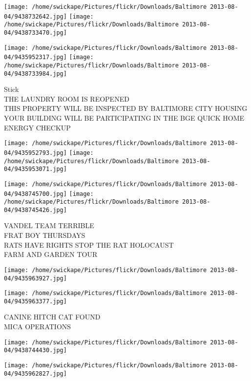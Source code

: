 \documentclass[10pt,letterpaper]{article}
\begin{document}
\texttt{[image: /home/swickape/Pictures/flickr/Downloads/Baltimore 2013-08-04/9438732642.jpg]}
\texttt{[image: /home/swickape/Pictures/flickr/Downloads/Baltimore 2013-08-04/9438733470.jpg]}

\texttt{[image: /home/swickape/Pictures/flickr/Downloads/Baltimore 2013-08-04/9435952317.jpg]}
\texttt{[image: /home/swickape/Pictures/flickr/Downloads/Baltimore 2013-08-04/9438733984.jpg]}

Stick\\
THE LAUNDRY ROOM IS REOPENED\\
THIS PROPERTY WILL BE INSPECTED BY BALTIMORE CITY HOUSING\\
YOUR BUILDING WILL BE PARTICIPATING IN THE BGE QUICK HOME ENERGY CHECKUP\\
\pagebreak

\texttt{[image: /home/swickape/Pictures/flickr/Downloads/Baltimore 2013-08-04/9435952793.jpg]}
\texttt{[image: /home/swickape/Pictures/flickr/Downloads/Baltimore 2013-08-04/9435953071.jpg]}

\texttt{[image: /home/swickape/Pictures/flickr/Downloads/Baltimore 2013-08-04/9438745700.jpg]}
\texttt{[image: /home/swickape/Pictures/flickr/Downloads/Baltimore 2013-08-04/9438745426.jpg]}

VANDEL TEAM TERRIBLE\\
FRAT BOY THURSDAYS\\
RATS HAVE RIGHTS STOP THE RAT HOLOCAUST\\
FARM AND GARDEN TOUR\\
\pagebreak

\texttt{[image: /home/swickape/Pictures/flickr/Downloads/Baltimore 2013-08-04/9435963927.jpg]}

\vspace{0.25in}
\texttt{[image: /home/swickape/Pictures/flickr/Downloads/Baltimore 2013-08-04/9435963377.jpg]}

CANINE HITCH CAT FOUND\\
MICA OPERATIONS\\
\pagebreak

\texttt{[image: /home/swickape/Pictures/flickr/Downloads/Baltimore 2013-08-04/9438744430.jpg]}

\vspace{0.25in}
\texttt{[image: /home/swickape/Pictures/flickr/Downloads/Baltimore 2013-08-04/9435962827.jpg]}
\end{document}
